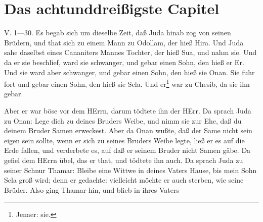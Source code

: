 \section{Das achtunddreißigste Capitel}

\begin{schriftzitat}
V. 1—30. Es begab sich um dieselbe Zeit, daß Juda hinab zog von seinen Brüdern, und that sich zu einem Mann zu Odollam, der hieß Hira. Und Juda sahe daselbst eines Cananiters Mannes Tochter, der hieß Sua, und nahm sie. Und da er sie beschlief, ward sie schwanger, und gebar einen Sohn, den hieß er Er. Und sie ward aber schwanger, und gebar einen Sohn, den hieß sie Onan. Sie fuhr fort und gebar einen Sohn, den hieß sie Sela. Und er\footnote{Jenaer: sie.} war zu Chesib, da sie ihn gebar.

Aber er war böse vor dem HErrn, darum tödtete ihn der HErr. Da sprach Juda zu Onan: Lege dich zu deines Bruders Weibe, und nimm sie zur Ehe, daß du deinem Bruder Samen erweckest. Aber da Onan wußte, daß der Same nicht sein eigen sein sollte, wenn er sich zu seines Bruders Weibe legte, ließ er es auf die Erde fallen, und verderbete es, auf daß er seinem Bruder nicht Samen gäbe. Da gefiel dem HErrn übel, das er that, und tödtete ihn auch. Da sprach Juda zu seiner Schnur Thamar: Bleibe eine Wittwe in deines Vaters Hause, bis mein Sohn Sela groß wird; denn er gedachte: vielleicht möchte er auch sterben, wie seine Brüder. Also ging Thamar hin, und blieb in ihres Vaters

\end{schriftzitat}
